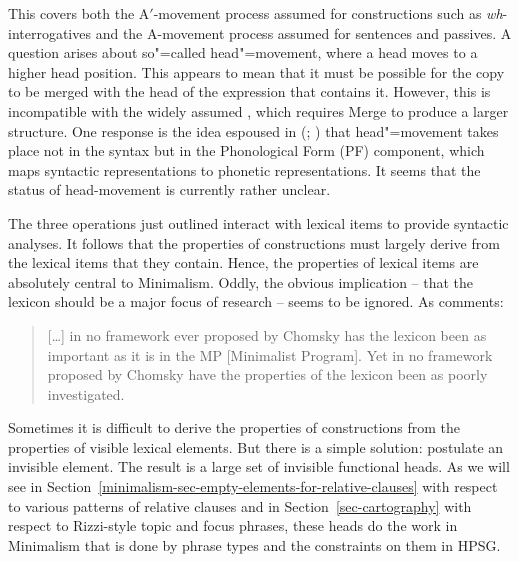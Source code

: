 \documentclass[output=paper
 	        ,biblatex
                ,babelshorthands
                ,newtxmath
                ,draftmode
                ,colorlinks, citecolor=brown
]{langscibook}
\begin{document}
This covers both the A$'$-movement process assumed for  constructions
such as \emph{wh}-interrogatives and the A-movement process assumed for  sentences and
passives. A question arises about so"=called head"=movement, where a head moves to a higher head
position. This appears to mean that it must be possible for the copy to be merged with the head of
the expression that contains it. However, this is incompatible with the widely assumed , which requires Merge to produce a larger structure. One response is the idea espoused in
\citeauthor{Chomsky95b-u} (\citeyear[368]{Chomsky95b-u}; \citeyear[37]{Chomsky2001a-u}) that
head"=movement takes place not in the syntax but in the Phonological Form (PF) component, which maps syntactic
representations to phonetic representations. It seems that the status of head-movement is currently rather unclear.

The three operations just outlined interact with lexical items to provide syntactic analyses. It follows that the properties of constructions must largely derive from the lexical items that they contain. Hence, the properties of lexical items are absolutely central to Minimalism. Oddly, the obvious implication – that the lexicon should be a major focus of research – seems to be ignored. As \citet[95, fn.\,9]{Newmeyer2005a} comments:
\begin{quote}
[\ldots] in no framework ever proposed by Chomsky has the lexicon been as important as it is in the
MP [Minimalist Program]. Yet in no framework proposed by Chomsky have the properties of the lexicon
been as poorly investigated. \citep[95, fn.\,9]{Newmeyer2005a}
\end{quote}
Sometimes it is difficult to derive the properties of constructions from the properties of visible
lexical elements. But there is a simple solution: postulate an invisible element. The result is a
large set of invisible functional heads. As we will see in
Section~\ref{minimalism-sec-empty-elements-for-relative-clauses} with respect to various patterns of
  relative clauses and in Section~\ref{sec-cartography} with respect to Rizzi-style topic and focus
  phrases, these heads do the work in Minimalism that is done by phrase types and the constraints
on them in HPSG.  
\end{document}
